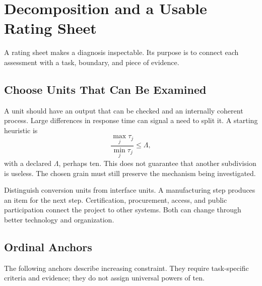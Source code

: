 \section{Decomposition and a Usable Rating Sheet}

A rating sheet makes a diagnosis inspectable. Its purpose is to connect each assessment with a task, boundary, and piece of evidence.

\subsection{Choose Units That Can Be Examined}

A unit should have an output that can be checked and an internally coherent process. Large differences in response time can signal a need to split it. A starting heuristic is
\begin{equation}
 \frac{\max_j\tau_j}{\min_j\tau_j}\leq\Lambda,
\end{equation}
with a declared $\Lambda$, perhaps ten. This does not guarantee that another subdivision is useless. The chosen grain must still preserve the mechanism being investigated.

Distinguish conversion units from interface units. A manufacturing step produces an item for the next step. Certification, procurement, access, and public participation connect the project to other systems. Both can change through better technology and organization.

\subsection{Ordinal Anchors}

The following anchors describe increasing constraint. They require task-specific criteria and evidence; they do not assign universal powers of ten.


